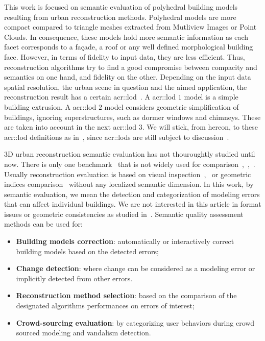 \documentclass[runningheads]{llncs}
\begin{document}
    This work is focused on semantic evaluation of polyhedral building models resulting from urban reconstruction methods. Polyhedral models are more compact compared to triangle meshes extracted from Mutliview Images or Point Clouds. In consequence, these models hold more semantic information as each facet corresponds to a fa\c{c}ade, a roof or any well defined morphological building face. However, in terms of fidelity to input data, they are less efficient. Thus, reconstruction algorithms try to find a good compromise between compacity and semantics on one hand, and fidelity on the other. Depending on the input data spatial resolution, the urban scene in question and the aimed application, the reconstruction result has a certain \acrfull{acr::lod}~\cite{kolbe2005citygml}. A \acrshort{acr::lod} $1$ model is a simple building extrusion. A \acrshort{acr::lod} $2$ model considers geometric simplification of buildings, ignoring superstructures, such as dormer windows and chimneys. These are taken into account in the next \acrshort{acr::lod} $3$. We will stick, from hereon, to these \acrshort{acr::lod} definitions as in~\cite{verdie2015lod}, since \glspl{acr::lod} are still subject to discussion~\cite{2016_ceus_improved_lod}.

    3D urban reconstruction semantic evaluation has not thouroughtly studied until now. There is only one benchmark~\cite{rottensteiner2014results} that is not widely used for comparison~\cite{Lafarge2012},~\cite{nguatem2017modeling},~\cite{li2016boxfitting}. Usually reconstruction evaluation is based on visual inspection~\cite{Durupt2006},~\cite{MacayMoreia2013} or geometric indices comparison~\cite{Kaartinen2005} without any localized semantic dimension. In this work, by semantic evaluation, we mean the detection and categorization of modeling errors that can affect individual buildings. We are not interested in this article in format issues or geometric consistencies as studied in~\cite{ledoux2018val3dity}. Semantic quality assessment methods can be used for:
    \begin{itemize}
        \item \textbf{Building models correction}: automatically or interactively correct building models based on the detected errors;
        \item \textbf{Change detection}: where change can be considered as a modeling error or implicitly detected from other errors.
        \item \textbf{Reconstruction method selection}: based on the comparison of the designated algorithms performances on errors of interest;
        \item \textbf{Crowd-sourcing evaluation}: by categorizing user behaviors during crowd sourced modeling and vandalism detection.
    \end{itemize}
\end{document}

